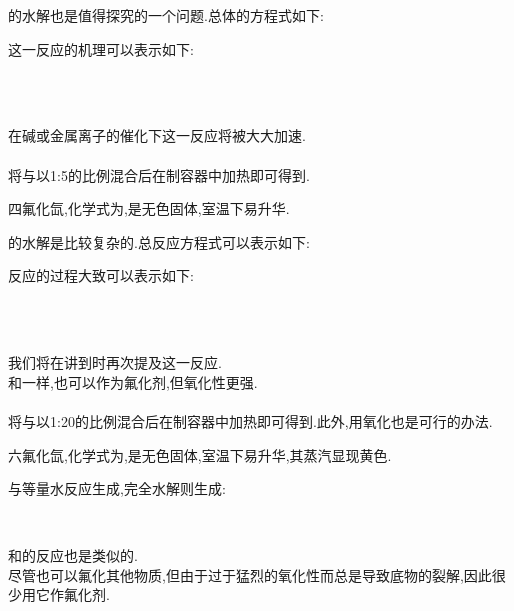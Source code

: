\documentclass{ctexart}
\begin{document}
\indent {}的水解也是值得探究的一个问题.总体的方程式如下:
\begin{center}
\end{center}
这一反应的机理可以表示如下:
\begin{center}
    \\
    \\
\end{center}
在碱或金属离子的催化下这一反应将被大大加速.
\paragraph{}
将与以1:5的比例混合后在制容器中加热即可得到.
\begin{substance}[\ce{XeF4}]
    四氟化氙,化学式为,是无色固体,室温下易升华.
\end{substance}
的水解是比较复杂的.总反应方程式可以表示如下:
\begin{center}
\end{center}
反应的过程大致可以表示如下:
\begin{center}
    \\
    \\
\end{center}
我们将在讲到时再次提及这一反应.\\
\indent 和一样,也可以作为氟化剂,但氧化性更强.
\paragraph{}
将与以1:20的比例混合后在制容器中加热即可得到.此外,用氧化也是可行的办法.
\begin{substance}[\ce{XeF6}]
    六氟化氙,化学式为,是无色固体,室温下易升华,其蒸汽显现黄色.
\end{substance}
与等量水反应生成,完全水解则生成:
\begin{center}
    \\
\end{center}
和的反应也是类似的.\\
\indent 尽管也可以氟化其他物质,但由于过于猛烈的氧化性而总是导致底物的裂解,因此很少用它作氟化剂.
\end{document}
